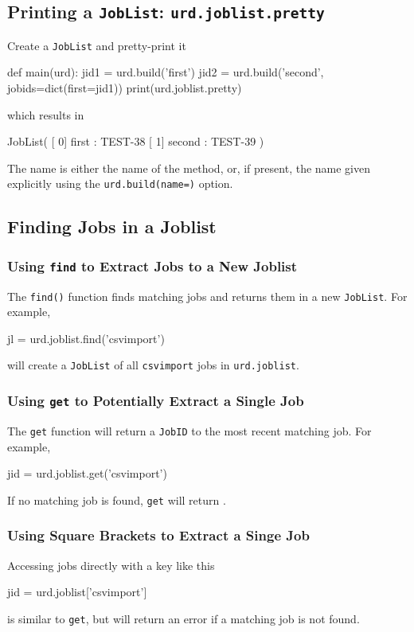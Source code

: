 \subsection{Printing a \texttt{JobList}:  \texttt{urd.joblist.pretty}}
Create a \texttt{JobList} and pretty-print it
\begin{python}
def main(urd):
    jid1 = urd.build('first')
    jid2 = urd.build('second', jobids=dict(first=jid1))
    print(urd.joblist.pretty)
\end{python}
which results in
\begin{shell}
JobList(
   [  0]  first : TEST-38
   [  1] second : TEST-39
)
\end{shell}
The name is either the name of the method, or, if present, the name
given explicitly using the \texttt{urd.build(name=)} option.


\subsection{Finding Jobs in a Joblist}

\subsubsection*{Using \texttt{find} to Extract Jobs to a New Joblist}
The \texttt{find()} function finds matching jobs and returns them in a
new \texttt{JobList}.  For example,
\begin{python}
jl = urd.joblist.find('csvimport')
\end{python}
will create a \texttt{JobList} of all \texttt{csvimport} jobs
in \texttt{urd.joblist}.


\subsubsection*{Using \texttt{get} to Potentially Extract a Single Job}
The \texttt{get} function will return a \texttt{JobID} to the most
recent matching job.  For example,
\begin{python}
jid = urd.joblist.get('csvimport')
\end{python}
If no matching job is found, \texttt{get} will return \pyNone.


\subsubsection*{Using Square Brackets to Extract a Singe Job}
Accessing jobs directly with a key like this
\begin{python}
jid = urd.joblist['csvimport']
\end{python}
is similar to \texttt{get}, but will return an error if a matching job
is not found.


